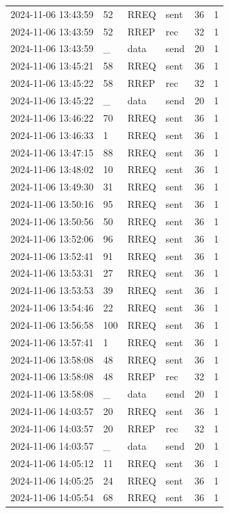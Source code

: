 \documentclass[]{nsm-thesis}
\begin{document}
\begin{longtable}{llllll}
2024-11-06 13:43:59 & 52 & RREQ & sent & 36 & 1 \\
2024-11-06 13:43:59 & 52 & RREP & rec & 32 & 1 \\
2024-11-06 13:43:59 & _ & data & send & 20 & 1 \\
2024-11-06 13:45:21 & 58 & RREQ & sent & 36 & 1 \\
2024-11-06 13:45:22 & 58 & RREP & rec & 32 & 1 \\
2024-11-06 13:45:22 & _ & data & send & 20 & 1 \\
2024-11-06 13:46:22 & 70 & RREQ & sent & 36 & 1 \\
2024-11-06 13:46:33 & 1 & RREQ & sent & 36 & 1 \\
2024-11-06 13:47:15 & 88 & RREQ & sent & 36 & 1 \\
2024-11-06 13:48:02 & 10 & RREQ & sent & 36 & 1 \\
2024-11-06 13:49:30 & 31 & RREQ & sent & 36 & 1 \\
2024-11-06 13:50:16 & 95 & RREQ & sent & 36 & 1 \\
2024-11-06 13:50:56 & 50 & RREQ & sent & 36 & 1 \\
2024-11-06 13:52:06 & 96 & RREQ & sent & 36 & 1 \\
2024-11-06 13:52:41 & 91 & RREQ & sent & 36 & 1 \\
2024-11-06 13:53:31 & 27 & RREQ & sent & 36 & 1 \\
2024-11-06 13:53:53 & 39 & RREQ & sent & 36 & 1 \\
2024-11-06 13:54:46 & 22 & RREQ & sent & 36 & 1 \\
2024-11-06 13:56:58 & 100 & RREQ & sent & 36 & 1 \\
2024-11-06 13:57:41 & 1 & RREQ & sent & 36 & 1 \\
2024-11-06 13:58:08 & 48 & RREQ & sent & 36 & 1 \\
2024-11-06 13:58:08 & 48 & RREP & rec & 32 & 1 \\
2024-11-06 13:58:08 & _ & data & send & 20 & 1 \\
2024-11-06 14:03:57 & 20 & RREQ & sent & 36 & 1 \\
2024-11-06 14:03:57 & 20 & RREP & rec & 32 & 1 \\
2024-11-06 14:03:57 & _ & data & send & 20 & 1 \\
2024-11-06 14:05:12 & 11 & RREQ & sent & 36 & 1 \\
2024-11-06 14:05:25 & 24 & RREQ & sent & 36 & 1 \\
2024-11-06 14:05:54 & 68 & RREQ & sent & 36 & 1 \\

\end{longtable}
\end{document}
